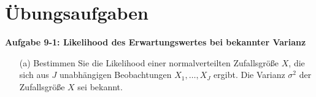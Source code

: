 \newpage
\section{Übungsaufgaben}
\textbf{Aufgabe 9-1: Likelihood des Erwartungswertes bei bekannter Varianz}
\begin{itemize}
	\item [(a)] Bestimmen Sie die Likelihood einer normalverteilten Zufallsgröße $X$, die sich aus $J$ unabhängigen Beobachtungen $X_1,\ldots,X_J$ ergibt. 
	Die Varianz $\sigma^2$ der Zufallsgröße $X$ sei bekannt.
\end{itemize}

